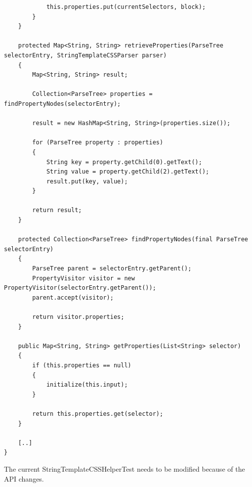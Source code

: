 \documentclass[11pt]{article}
\begin{document}
\begin{verbatim}
            this.properties.put(currentSelectors, block);
        }
    }

    protected Map<String, String> retrieveProperties(ParseTree selectorEntry, StringTemplateCSSParser parser)
    {
        Map<String, String> result;

        Collection<ParseTree> properties = findPropertyNodes(selectorEntry);

        result = new HashMap<String, String>(properties.size());

        for (ParseTree property : properties)
        {
            String key = property.getChild(0).getText();
            String value = property.getChild(2).getText();
            result.put(key, value);
        }

        return result;
    }

    protected Collection<ParseTree> findPropertyNodes(final ParseTree selectorEntry)
    {
        ParseTree parent = selectorEntry.getParent();
        PropertyVisitor visitor = new PropertyVisitor(selectorEntry.getParent());
        parent.accept(visitor);

        return visitor.properties;
    }

    public Map<String, String> getProperties(List<String> selector)
    {
        if (this.properties == null)
        {
            initialize(this.input);
        }

        return this.properties.get(selector);
    }

    [..]
}
\end{verbatim}

The current StringTemplateCSSHelperTest needs to be modified because of the API changes.
\end{document}
